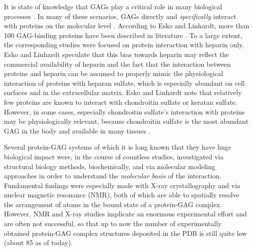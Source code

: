 It is state of knowledge that GAGs play a critical role in many biological
processes \cite{handel_2005}. In many of these scenarios, GAGs directly and
\textit{specifically} interact with proteins on the molecular level
\cite{prot_gags_glycomics_review_2006}. According to Esko and Linhardt, more
than 100 GAG-binding proteins have been described in literature
\cite{essentials_glycobiology_protgags_2009}. To a large extent, the
corresponding studies were focused on protein interaction with heparin only.
Esko and Linhardt speculate that this bias towards heparin may reflect the
commercial availability of heparin and the fact that the interaction between
proteins and heparin can be assumed to properly mimic the physiological
interaction of proteins with heparan sulfate, which is especially abundant on
cell surfaces and in the extracellular matrix. Esko and Linhardt note that
relatively few proteins are known to interact with chondroitin sulfate or
keratan sulfate. However, in some cases, especially chondroitin sulfate's
interaction with proteins may be physiologically relevant, because chondroitin
sulfate is the most abundant GAG in the body
\cite{gandhi_structure_2008} and available in many tissues
\cite{essentials_glycobiology_protgags_2009}.

Several protein-GAG systems of which it is long known that they have huge
biological impact were, in the course of countless studies, investigated via
structural biology methods, biochemically, and via molecular modeling approaches
in order to understand the \textit{molecular basis} of the interaction.
Fundamental findings were especially made with X-ray crystallography and via
nuclear magnetic resonance (NMR), both of which are able to spatially resolve
the arrangement of atoms in the bound state of a protein-GAG complex. However,
NMR and X-ray studies implicate an enormous experimental effort and are often
not successful, so that up to now the number of experimentally obtained
protein-GAG complex structures deposited in the PDB is still quite low (about
85 as of today).


